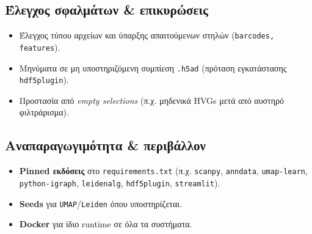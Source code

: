 \documentclass[12pt,a4paper]{article}
\begin{document}
\subsection{Έλεγχος σφαλμάτων \& επικυρώσεις}
\begin{itemize}
  \item Έλεγχος τύπου αρχείων και ύπαρξης απαιτούμενων στηλών (\texttt{barcodes, features}).
  \item Μηνύματα σε μη υποστηριζόμενη συμπίεση \texttt{.h5ad} (πρόταση εγκατάστασης \texttt{hdf5plugin}).
  \item Προστασία από \textit{empty selections} (π.χ. μηδενικά HVGs μετά από αυστηρό φιλτράρισμα).
\end{itemize}

\subsection{Αναπαραγωγιμότητα \& περιβάλλον}
\begin{itemize}
  \item \textbf{Pinned εκδόσεις} στο \texttt{requirements.txt} (π.χ. \texttt{scanpy}, \texttt{anndata}, \texttt{umap-learn}, \texttt{python-igraph}, \texttt{leidenalg}, \texttt{hdf5plugin}, \texttt{streamlit}).
  \item \textbf{Seeds} για \texttt{UMAP}/\texttt{Leiden} όπου υποστηρίζεται.
  \item \textbf{Docker} για ίδιο runtime σε όλα τα συστήματα.
\end{itemize}
\end{document}
